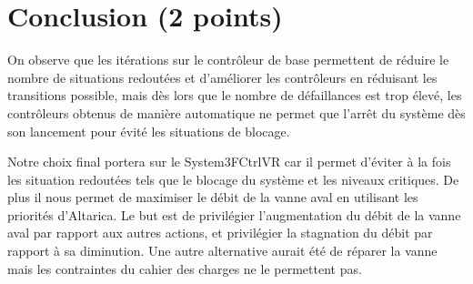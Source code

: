 \documentclass[a4paper]{book}
\begin{document}
\section{Conclusion (2 points)}

On observe que les itérations sur le contrôleur de base permettent de réduire le nombre de situations redoutées et d'améliorer les contrôleurs en réduisant les transitions possible, mais dès lors que le nombre de défaillances est trop élevé, les contrôleurs obtenus de manière automatique ne permet que l'arrêt du système dès son lancement pour évité les situations de blocage.\

Notre choix final portera sur le System3FCtrlVR car il permet d’éviter à la fois les situation redoutées tels que le blocage du système et les niveaux critiques. De plus il nous permet de maximiser le débit de la vanne aval en utilisant les priorités d’Altarica. Le but est de privilégier l’augmentation du débit de la vanne aval par rapport aux autres actions, et privilégier la stagnation du débit par rapport à sa diminution. Une autre alternative aurait été de réparer la vanne mais les contraintes du cahier des charges ne le permettent pas.\
\end{document}
